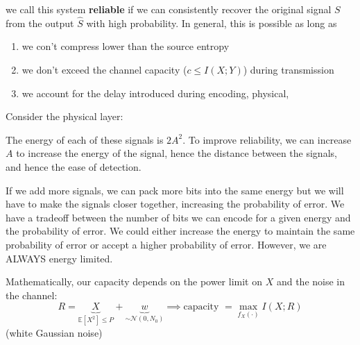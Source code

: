 \documentclass[12pt]{report}
\renewcommand{\hat}[1]{\widehat{#1}}
\newcommand{\E}{\mathbb{E}}
\newcommand{\Nc}{\mathcal{N}}
\newcommand*{\tbf}[1]{\ifmmode\mathbf{#1}\else\textbf{#1}\fi}
\begin{document}

we call this system \tbf{reliable} if we can consistently recover the original signal $S$ from the output $\hat S$ with high probability. In general, this is possible as long as 
\begin{enumerate}
    \item we con't compress lower than the source entropy 
    \item we don't exceed the channel capacity ($c \leq I(X; Y)$) during transmission 
    \item we account for the delay introduced during encoding, physical, 
\end{enumerate}

Consider the physical layer:

\begin{center}
\end{center}

The energy of each of these signals is $2A^2$. To improve reliability, we can increase $A$ to increase the energy of the signal, hence the distance between the signals, and hence the ease of detection. 

If we add more signals, we can pack more bits into the same energy but we will have to make the signals closer together, increasing the probability of error. We have a tradeoff between the number of bits we can encode for a given energy and the probability of error. We could either increase the energy to maintain the same probability of error or accept a higher probability of error. However, we are ALWAYS energy limited. 

Mathematically, our capacity depends on the power limit on $X$ and the noise in the channel:
\[R = \underbrace{X}_{\E[X^2] \leq P} + \underbrace{w}_{\sim \Nc(0, N_0)} \implies \text{capacity } = \max_{f_X(\cdot)} I(X; R)\]
(white Gaussian noise) 
\end{document}

